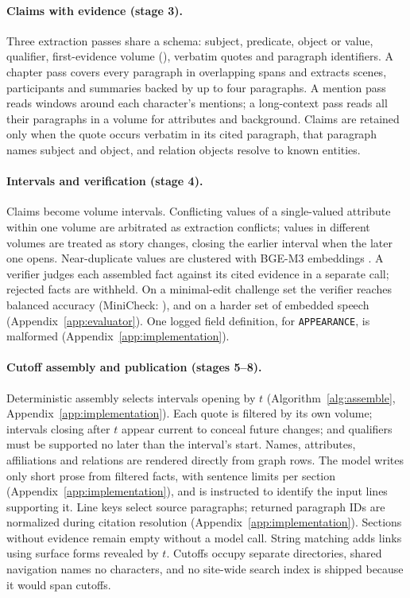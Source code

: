 \paragraph{Claims with evidence (stage 3).}
Three extraction passes share a schema: subject, predicate, object or value, qualifier,
first-evidence volume (\firstvol), verbatim quotes and paragraph identifiers.
A chapter pass covers every paragraph in overlapping spans and extracts scenes, participants
and summaries backed by up to four paragraphs. A mention pass reads windows around each
character's mentions; a long-context pass reads all their paragraphs in a volume for
attributes and background. Claims are retained only when the quote occurs verbatim in its
cited paragraph, that paragraph names subject and object, and relation objects resolve to
known entities.

\paragraph{Intervals and verification (stage 4).}
Claims become volume intervals. Conflicting values of a single-valued attribute within one
volume are arbitrated as extraction conflicts; values in different volumes are treated as
story changes, closing the earlier interval when the later one opens. Near-duplicate values
are clustered with BGE-M3 embeddings \citep{chen2024m3}. A verifier judges each assembled
fact against its cited evidence in a separate call; rejected facts are withheld.
On a minimal-edit challenge set the verifier reaches  balanced
accuracy (MiniCheck: ), and  on a harder set
of embedded speech (Appendix~\ref{app:evaluator}). One logged field definition, for
\texttt{APPEARANCE}, is malformed (Appendix~\ref{app:implementation}).

\paragraph{Cutoff assembly and publication (stages 5--8).}
Deterministic assembly selects intervals opening by $t$
(Algorithm~\ref{alg:assemble}, Appendix~\ref{app:implementation}). Each quote is filtered
by its own volume; intervals closing after $t$ appear current to conceal future changes;
and qualifiers must be supported no later than the interval's start. Names, attributes,
affiliations and relations are rendered directly from graph rows. The model writes only
short prose from filtered facts, with sentence limits per section
(Appendix~\ref{app:implementation}), and is instructed to identify the input lines supporting it.
Line keys select source paragraphs; returned paragraph IDs are normalized during citation
resolution (Appendix~\ref{app:implementation}). Sections without evidence remain empty
without a model call.
String matching adds links using surface forms revealed by $t$. Cutoffs occupy separate
directories, shared navigation names no characters, and no site-wide search index is shipped
because it would span cutoffs.

